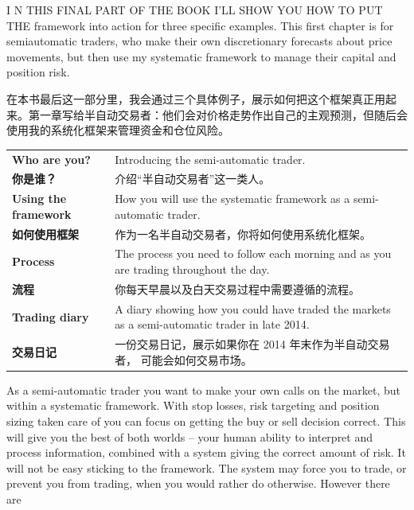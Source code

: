 
\begin{englishblock} I N THIS FINAL PART OF THE BOOK I'LL SHOW YOU HOW TO PUT THE framework into action for three specific examples. This first chapter is for semiautomatic traders, who make their own discretionary forecasts about price movements, but then use my systematic framework to manage their capital and position risk. \end{englishblock}

\begin{chineseblock}在本书最后这一部分里，我会通过三个具体例子，展示如何把这个框架真正用起来。第一章写给半自动交易者：他们会对价格走势作出自己的主观预测，但随后会使用我的系统化框架来管理资金和仓位风险。\end{chineseblock}


\begin{bilingualtableblock} \begin{tabularx}{\textwidth}{@{} p{} Y@{}}\textbf{Who are you?} & Introducing the semi-automatic trader. \\

\textbf{你是谁？} & 介绍“半自动交易者”这一类人。 \\
\textbf{Using the framework} & How you will use the systematic framework as a semi-automatic trader. \\
\textbf{如何使用框架} & 作为一名半自动交易者，你将如何使用系统化框架。 \\
\textbf{Process} & The process you need to follow each morning and as you are trading throughout the day. \\
\textbf{流程} & 你每天早晨以及白天交易过程中需要遵循的流程。 \\
\textbf{Trading diary} & A diary showing how you could have traded the markets as a semi-automatic trader in late 2014. \\
\textbf{交易日记} & 一份交易日记，展示如果你在 2014 年末作为半自动交易者， 可能会如何交易市场。 \\
\end{tabularx}
\end{bilingualtableblock}


\begin{englishblock} As a semi-automatic trader you want to make your own calls on the market, but within a systematic framework. With stop losses, risk targeting and position sizing taken care of you can focus on getting the buy or sell decision correct. This will give you the best of both worlds -- your human ability to interpret and process information, combined with a system giving the correct amount of risk. It will not be easy sticking to the framework. The system may force you to trade, or prevent you from trading, when you would rather do otherwise. However there are \end{englishblock}


